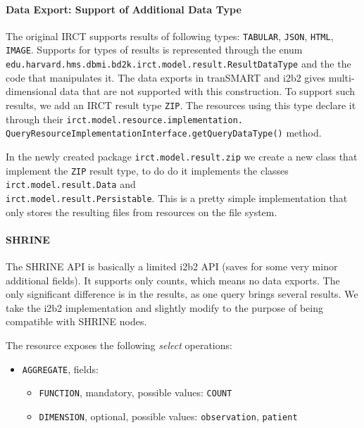 \paragraph{Data Export: Support of Additional Data Type}

The original IRCT supports results of following types: \verb|TABULAR|, \verb|JSON|, \verb|HTML|, \verb|IMAGE|.
Supports for types of results is represented through the enum \verb|edu.harvard.hms.dbmi.bd2k.irct.model.result.ResultDataType| and the the code that manipulates it.
The data exports in tranSMART and i2b2 gives multi-dimensional data that are not supported with this construction.
To support such results, we add an IRCT result type \verb|ZIP|.
The resources using this type declare it through their \verb|irct.model.resource.implementation.| \\
\verb|QueryResourceImplementationInterface.getQueryDataType()| method.

In the newly created package \verb|irct.model.result.zip| we create a new class that implement the \verb|ZIP| result type, to do do it implements the classes
\verb|irct.model.result.Data| and \\
\verb|irct.model.result.Persistable|.
This is a pretty simple implementation that only stores the resulting files from resources on the file system.


\paragraph{SHRINE}
The SHRINE API is basically a limited i2b2 API (saves for some very minor additional fields).
It supports only counts, which means no data exports.
The only significant difference is in the results, as one query brings several results.
We take the i2b2 implementation and slightly modify to the purpose of being compatible with SHRINE nodes.

The resource exposes the following \emph{select} operations:
\begin{itemize}
    \item \verb|AGGREGATE|, fields:
    \begin{itemize}
        \item \verb|FUNCTION|, mandatory, possible values:
        \verb|COUNT|
        
        \item \verb|DIMENSION|, optional, possible values:
        \verb|observation|,
        \verb|patient|
    \end{itemize}
\end{itemize}

